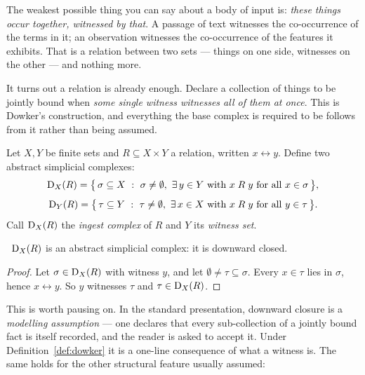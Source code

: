 \begin{intu}\Intu
The weakest possible thing you can say about a body of input is: \emph{these
things occur together, witnessed by that}. A passage of text witnesses the
co-occurrence of the terms in it; an observation witnesses the co-occurrence
of the features it exhibits. That is a relation between two sets --- things on
one side, witnesses on the other --- and nothing more.

It turns out a relation is already enough. Declare a collection of things to
be jointly bound when \emph{some single witness witnesses all of them at
once}. This is Dowker's construction, and everything the base complex is
required to be follows from it rather than being assumed.
\end{intu}

\begin{definition}\label{def:dowker}
Let $X,Y$ be finite sets and $R\subseteq X\times Y$ a relation, written
$x\rel y$. Define two abstract simplicial complexes:
\[
  \Dow{X}(R)=\bigl\{\,\sigma\subseteq X \ :\ \sigma\neq\emptyset,\
     \exists\,y\in Y \text{ with } x\rel y \text{ for all } x\in\sigma \,\bigr\},
\]
\[
  \Dow{Y}(R)=\bigl\{\,\tau\subseteq Y \ :\ \tau\neq\emptyset,\
     \exists\,x\in X \text{ with } x\rel y \text{ for all } y\in\tau \,\bigr\}.
\]
Call $\mathrm{D}_{X}(R)$ the \emph{ingest complex} of $R$ and $Y$ its
\emph{witness set}.
\end{definition}

\begin{proposition}[Downward closure is free]\label{prop:closurefree}
\Proved\ $\mathrm{D}_{X}(R)$ is an abstract simplicial complex: it is downward
closed.
\end{proposition}
\begin{proof}
Let $\sigma\in\mathrm{D}_{X}(R)$ with witness $y$, and let
$\emptyset\neq\tau\subseteq\sigma$. Every $x\in\tau$ lies in $\sigma$, hence
$x\rel y$. So $y$ witnesses $\tau$ and $\tau\in\mathrm{D}_{X}(R)$.
\end{proof}

This is worth pausing on. In the standard presentation, downward closure is a
\emph{modelling assumption} --- one declares that every sub-collection of a
jointly bound fact is itself recorded, and the reader is asked to accept it.
Under Definition~\ref{def:dowker} it is a one-line consequence of what a
witness is. The same holds for the other structural feature usually assumed:

